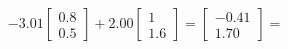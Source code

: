 \documentclass[preview]{standalone}
\begin{document}
\begin{align*}
-3.01 \begin{bmatrix} 0.8 \\ 0.5 \end{bmatrix} + 2.00 \begin{bmatrix} 1 \\ 1.6 \end{bmatrix} = \begin{bmatrix} -0.41 \\ 1.70 \end{bmatrix} =
\end{align*}
\end{document}
